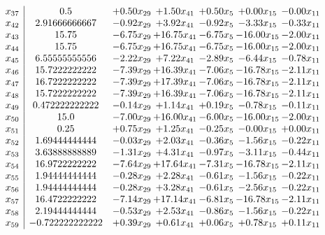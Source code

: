 \documentclass[8pt]{article}
\begin{document}
\[\begin{array}{c| c c@{\hskip 2pt} c@{\hskip 2pt} c@{\hskip 2pt} c@{\hskip 2pt} c@{\hskip 2pt} }
 x_{37}   &  0.5 & +  0.50 x_{29} & +  1.50 x_{41} & +  0.50 x_{5} & +  0.00 x_{15} & -0.00 x_{11}\\
 x_{42}   &  2.91666666667 & -0.92 x_{29} & +  3.92 x_{41} & -0.92 x_{5} & -3.33 x_{15} & -0.33 x_{11}\\
 x_{43}   &  15.75 & -6.75 x_{29} & + 16.75 x_{41} & -6.75 x_{5} & -16.00 x_{15} & -2.00 x_{11}\\
 x_{44}   &  15.75 & -6.75 x_{29} & + 16.75 x_{41} & -6.75 x_{5} & -16.00 x_{15} & -2.00 x_{11}\\
 x_{45}   &  6.55555555556 & -2.22 x_{29} & +  7.22 x_{41} & -2.89 x_{5} & -6.44 x_{15} & -0.78 x_{11}\\
 x_{46}   &  15.7222222222 & -7.39 x_{29} & + 16.39 x_{41} & -7.06 x_{5} & -16.78 x_{15} & -2.11 x_{11}\\
 x_{47}   &  16.7222222222 & -7.39 x_{29} & + 17.39 x_{41} & -7.06 x_{5} & -16.78 x_{15} & -2.11 x_{11}\\
 x_{48}   &  15.7222222222 & -7.39 x_{29} & + 16.39 x_{41} & -7.06 x_{5} & -16.78 x_{15} & -2.11 x_{11}\\
 x_{49}   &  0.472222222222 & -0.14 x_{29} & +  1.14 x_{41} & +  0.19 x_{5} & -0.78 x_{15} & -0.11 x_{11}\\
 x_{50}   &  15.0 & -7.00 x_{29} & + 16.00 x_{41} & -6.00 x_{5} & -16.00 x_{15} & -2.00 x_{11}\\
 x_{51}   &  0.25 & +  0.75 x_{29} & +  1.25 x_{41} & -0.25 x_{5} & -0.00 x_{15} & +  0.00 x_{11}\\
 x_{52}   &  1.69444444444 & -0.03 x_{29} & +  2.03 x_{41} & -0.36 x_{5} & -1.56 x_{15} & -0.22 x_{11}\\
 x_{53}   &  3.63888888889 & -1.31 x_{29} & +  4.31 x_{41} & -0.97 x_{5} & -3.11 x_{15} & -0.44 x_{11}\\
 x_{54}   &  16.9722222222 & -7.64 x_{29} & + 17.64 x_{41} & -7.31 x_{5} & -16.78 x_{15} & -2.11 x_{11}\\
 x_{55}   &  1.94444444444 & -0.28 x_{29} & +  2.28 x_{41} & -0.61 x_{5} & -1.56 x_{15} & -0.22 x_{11}\\
 x_{56}   &  1.94444444444 & -0.28 x_{29} & +  3.28 x_{41} & -0.61 x_{5} & -2.56 x_{15} & -0.22 x_{11}\\
 x_{57}   &  16.4722222222 & -7.14 x_{29} & + 17.14 x_{41} & -6.81 x_{5} & -16.78 x_{15} & -2.11 x_{11}\\
 x_{58}   &  2.19444444444 & -0.53 x_{29} & +  2.53 x_{41} & -0.86 x_{5} & -1.56 x_{15} & -0.22 x_{11}\\
 x_{59}   &  -0.722222222222 & +  0.39 x_{29} & +  0.61 x_{41} & +  0.06 x_{5} & +  0.78 x_{15} & +  0.11 x_{11}\\

\end{array}\]
\end{document}
